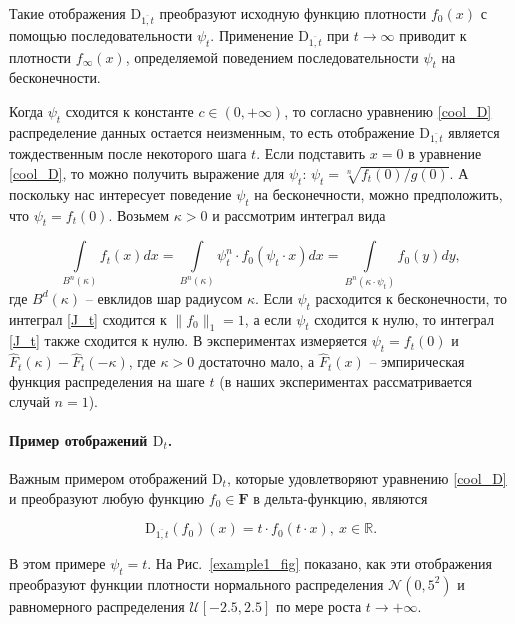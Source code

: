        Такие отображения $\text{D}_{\overline{1, t}}$ преобразуют исходную функцию плотности $f_0(x)$ с помощью последовательности $\psi_t$. Применение $\text{D}_{\overline{1, t}}$ при $t \to \infty$ приводит к плотности $f_\infty(x)$, определяемой поведением последовательности $\psi_t$ на бесконечности.
    
        Когда $\psi_t$ сходится к константе $c \in (0, +\infty)$, то согласно уравнению \eqref{cool_D} распределение данных остается неизменным, то есть отображение $\text{D}_{\overline{1, t}}$ является тождественным после некоторого шага $t$.
        Если подставить $x = 0$ в уравнение \eqref{cool_D}, то можно получить выражение для $\psi_t$: $\psi_t = \sqrt[n]{f_t(0) / g(0)}$. А поскольку нас интересует поведение $\psi_t$ на бесконечности, можно предположить, что $\psi_t = f_t(0)$.  Возьмем $\kappa > 0$ и рассмотрим интеграл вида 
    
        \begin{equation} \label{J_t}
            \int\limits_{B^n(\kappa)}f_t(x)dx = \int\limits_{B^n(\kappa)}\psi_t^n \cdot f_0(\psi_t \cdot x)dx = \int\limits_{B^n(\kappa \cdot \psi_t)} f_0(y)dy,
        \end{equation}
        где $B^d(\kappa)$ -- евклидов шар радиусом $\kappa$. Если $\psi_t$ расходится к бесконечности, то интеграл \eqref{J_t} сходится к $\|f_0\|_1 = 1$, а если $\psi_t$ сходится к нулю, то интеграл \eqref{J_t} также сходится к нулю. В экспериментах измеряется $\psi_t = f_t(0)$ и $\hat{F}_t(\kappa) - \hat{F}_t(-\kappa)$, где $\kappa > 0$ достаточно мало, а $\hat{F}_t(x)$ -- эмпирическая функция распределения на шаге $t$ (в наших экспериментах рассматривается случай $n=1$). 
    
        \paragraph{Пример отображений $\text{D}_t$.} Важным примером отображений $\text{D}_t$, которые удовлетворяют уравнению \eqref{cool_D} и преобразуют любую функцию $f_0 \in \textbf{F}$ в дельта-функцию, являются
    
        \begin{equation*}
            \text{D}_{\overline{1, t}}(f_0)(x) = t \cdot f_0(t \cdot x), ~x \in \mathbb{R}.
        \end{equation*}
        
        В этом примере $\psi_t = t$. На Рис.~\ref{example1_fig} показано, как эти отображения преобразуют функции плотности нормального распределения $\mathcal{N}(0, 5^2)$ и равномерного распределения $\mathcal{U}[-2.5, 2.5]$ по мере роста $t \to +\infty$.
    
